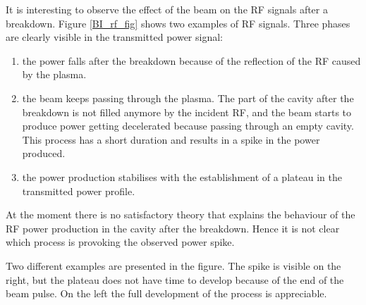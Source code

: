 It is interesting to observe the effect of the beam on the RF signals after a breakdown. Figure \ref{BI_rf_fig}  shows two examples of RF signals. Three phases are clearly visible in the transmitted power signal: 
\begin{enumerate}
\item the power falls after the breakdown because of the reflection of the RF caused by the plasma.
\item the beam keeps passing through the plasma. The part of the cavity after the breakdown is not filled anymore by the incident RF, and the beam starts to produce power getting decelerated because passing through an empty cavity. This process has a short duration and results in a spike in the power produced. 
\item the power production stabilises with the establishment of a plateau in the transmitted power profile.
\end{enumerate}
At the moment there is no satisfactory theory that explains the behaviour of the RF power production in the cavity after the breakdown. Hence it is not clear which process is provoking the observed power spike.

Two different examples are presented in the figure. The spike is visible on the right, but the plateau does not have time to develop because of the end of the beam pulse. On the left the full development of the process is appreciable.

